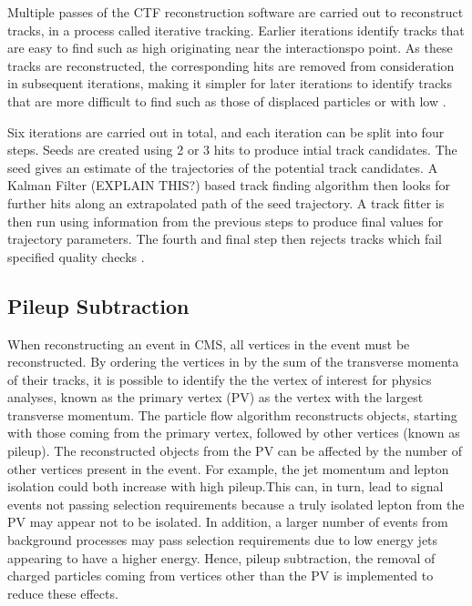 Multiple passes of the CTF reconstruction software are carried out to reconstruct tracks, in a process called
iterative tracking. Earlier iterations identify tracks that are easy to find such as high \pt originating
near the interactionspo point. As these tracks are reconstructed, the corresponding hits are removed from
consideration in subsequent iterations, making it simpler for later iterations to identify tracks that are
more difficult to find such as those of displaced particles or with low \pt.

Six iterations are carried out in total, and each iteration can be split into four steps. Seeds are created
using 2 or 3 hits to produce intial track candidates. The seed gives an estimate of the trajectories of the
potential track candidates. A Kalman Filter (EXPLAIN THIS?) \cite{kalman_filter} based track finding algorithm
then looks for further hits along an extrapolated path of the seed trajectory. A track fitter is then run
using information from the previous steps to produce final values for trajectory parameters. The fourth and
final step then rejects tracks which fail specified quality checks \cite{track_reconstruction}.

\subsection{Pileup Subtraction}
\label{ss:pileup_subtraction}
When reconstructing an event in CMS, all vertices in the event must be reconstructed. By ordering the vertices
in by the sum of the transverse momenta of their tracks, it is possible to identify the the vertex of interest
for physics analyses, known as the primary vertex (PV) as the vertex with the largest transverse momentum. The
particle flow algorithm reconstructs objects, starting with those coming from the primary vertex, followed by
other vertices (known as pileup). The reconstructed objects from the PV can be affected by the number of other
vertices present in the event. For example, the jet momentum and lepton isolation could both increase with
high pileup.This can, in turn, lead to signal events not passing selection requirements because a truly
isolated lepton from the PV may appear not to be isolated. In addition, a larger number of events from
background processes may pass selection requirements due to low energy jets appearing to have a higher energy.
Hence, pileup subtraction, the removal of charged particles coming from vertices other than the PV is
implemented to reduce these effects.

